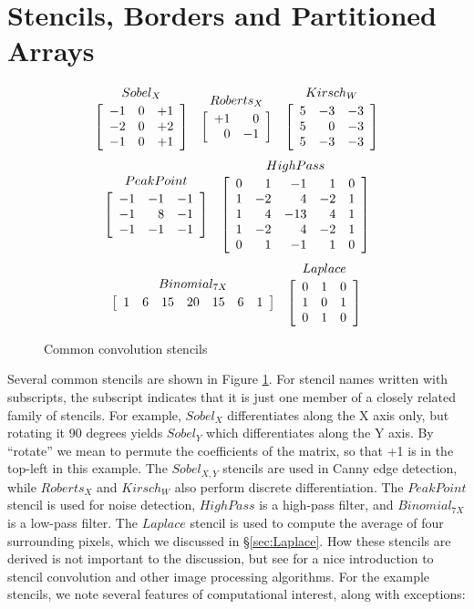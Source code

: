 
\section{Stencils, Borders and Partitioned Arrays}
\label{sec:Stencils}

\begin{figure}
\[	\stencil{Sobel_X}{rrr}
	{ -1 &  0 & +1 \\
	  -2 &  0 & +2 \\
	  -1 &  0 & +1 } \\
%
	\stencil{Roberts_X}{rr}
	{ +1 &  0 \\
	   0 & -1 }
%
	\stencil{Kirsch_W}{rrr}
	{  5 & -3 & -3 \\
	   5 &  0 & -3 \\
	   5 & -3 & -3 }
\]
\[	\stencil{PeakPoint}{rrr}
	{  -1 & -1 & -1 \\
	   -1 & 8  & -1 \\
	   -1 & -1 & -1 }
%
	\stencil{HighPass}{rrrrr}
	{  0 &   1 &  -1 &   1 &   0 \\
	   1 &  -2 &   4 &  -2 &   1 \\
	   1 &   4 & -13 &   4 &   1 \\
	   1 &  -2 &   4 &  -2 &   1 \\
	   0 &   1 &  -1 &   1 &   0 }
\]
\[	\stencil{Binomial_{7X}}{rrrrrrr}
	{ 1 & 6 & 15 & 20 & 15 & 6 & 1 }
%
	\stencil{Laplace}{rrr}
	{ 0 & 1 & 0 \\
	  1 & 0 & 1 \\
	  0 & 1 & 0 }
\]
\caption{Common convolution stencils}
\label{Fig:ExampleKernels}
\end{figure}

Several common stencils are shown in Figure \ref{Fig:ExampleKernels}. For stencil names written with subscripts, the subscript indicates that it is just one member of a closely related family of stencils. For example, $Sobel_X$ differentiates along the X axis only, but rotating it 90 degrees yields $Sobel_Y$ which differentiates along the Y axis. By ``rotate'' we mean to permute the coefficients of the matrix, so that +1 is in the top-left in this example. The $Sobel_{X,Y}$ stencils are used in Canny edge detection, while $Roberts_X$ and $Kirsch_W$ also perform discrete differentiation. The $PeakPoint$ stencil is used for noise detection, $HighPass$ is a high-pass filter, and $Binomial_{7X}$ is a low-pass filter. The $Laplace$ stencil is used to compute the average of four surrounding pixels, which we discussed in \S\ref{sec:Laplace}. How these stencils are derived is not important to the discussion, but see \cite{O'Gorman:algorithms-for-image-analysis} for a nice introduction to stencil convolution and other image processing algorithms. For the example stencils, we note several features of computational interest, along with exceptions: 

